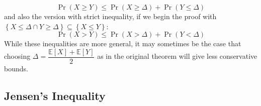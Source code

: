 \documentclass[11pt]{report} %
\begin{document}
\begin{equation}
\operatorname{Pr}\left(X \geq Y\right) \leq \operatorname{Pr}\left(X \geq \Delta\right) + \operatorname{Pr}\left(Y \leq \Delta\right)
\end{equation}
and also the version with strict inequality, if we begin the proof with $\left\{X \leq \Delta \cap Y \geq \Delta\right\} \subseteq \left\{X \leq Y\right\}$:
\begin{equation}
\operatorname{Pr}\left(X > Y\right) \leq \operatorname{Pr}\left(X > \Delta\right) + \operatorname{Pr}\left(Y < \Delta\right)
\end{equation}
While these inequalities are more general, it may sometimes be the case that choosing $\Delta = \dfrac{\mathbb{E}\left[X\right] + \mathbb{E}\left[Y\right]}{2}$ as in the original theorem will give less conservative bounds.

\subsection{Jensen's Inequality}
\end{document}
